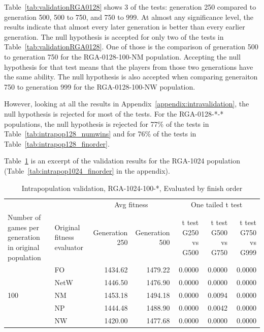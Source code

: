 Table~\ref{tab:validationRGA0128} shows 3 of the tests: generation 250 compared
to generation 500, 500 to 750, and 750 to 999. At almost any significance level,
the results indicate that almost every later generation is better than every
earlier generation. The null hypothesis is accepted for only two of the tests in
Table~\ref{tab:validationRGA0128}. One of those is the comparison of generation
500 to generation 750 for the RGA-0128-100-NM population. Accepting the null
hypothesis for that test means that the players from those two generations have
the same ability. The null hypothesis is also accepted when comparing
generaiton 750 to generation 999 for the RGA-0128-100-NW population.

However, looking at all the results in Appendix~\ref{appendix:intravalidation}, 
the null hypothesis is rejected for most of the tests. For the RGA-0128-*-*
populations, the null hypothesis is rejected for 77\% of the tests in
Table~\ref{tab:intrapop128_numwins} and for 76\% of the tests in
Table~\ref{tab:intrapop128_finorder}.

Table~\ref{tab:validationRGA1024} is an excerpt of the validation results
for the RGA-1024 population (Table~\ref{tab:intrapop1024_finorder} in the
appendix).

\begin{table}[ht]
  \centering
  \caption{Intrapopulation validation, RGA-1024-100-*, Evaluated by finish order}
    \begin{tabularx}{\linewidth}{|p{1in}|p{1in}|r|r|r|r|r|}
    \cline{3-7}
    \multicolumn{1}{l}{} &  & \multicolumn{2}{c|}{Avg fitness} & \multicolumn{3}{c|}{One tailed t test} \\
    \cline{1-7}
    Number of games per generation in original population
    & Original fitness evaluator
    & \multicolumn{1}{p{0.7in}|}{Generation 250}
    & \multicolumn{1}{p{0.7in}|}{Generation 500}
    & \multicolumn{1}{X|}{t test G250 vs G500}
    & \multicolumn{1}{X|}{t test G500 vs G750}
    & \multicolumn{1}{X|}{t test G750 vs G999} \\
    \cline{1-7}
      \multirow{5}{*}{100} 
      & FO & 1434.62 & 1479.22 & 0.0000 & 0.0000 & 0.0000 \\
\cline{2-7}             
      & NetW & 1446.50 & 1476.90 & 0.0000 & 0.0000 & 0.0000 \\
\cline{2-7}     
      & NM & 1453.18 & 1494.18 & 0.0000 & 0.0094 & 0.0000 \\
\cline{2-7}    
      & NP & 1444.48 & 1488.90 & 0.0000 & 0.0042 & 0.0000 \\
\cline{2-7}   
      & NW & 1420.00 & 1477.68 & 0.0000 & 0.0000 & 0.0000 \\
      \cline{1-7}
    \end{tabularx}%
  \label{tab:validationRGA1024}%
\end{table}%

